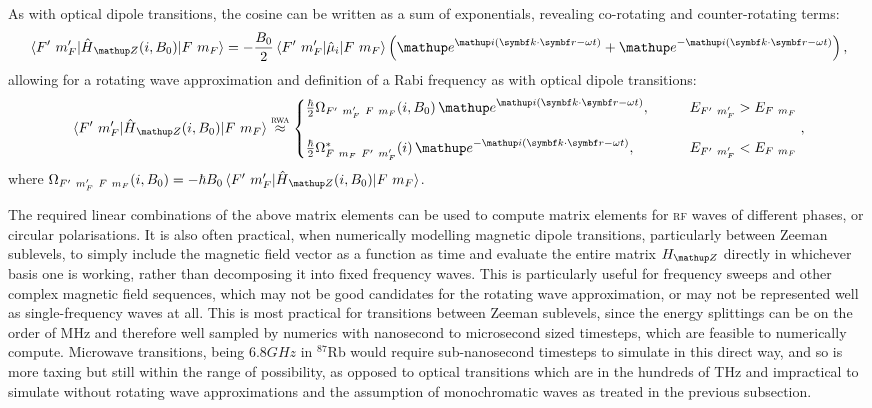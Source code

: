 As with optical dipole transitions, the cosine can be written as a sum of exponentials, revealing co-rotating and counter-rotating terms:
\begin{align}
\matrixel{F^\prime\ m_F^\prime}{\hat H_\up{Z}(i, B_0)}{F\ m_F}
=
-\frac{B_0}2\matrixel{F^\prime\ m_F^\prime}{\hat{\mu}_i}{F\ m_F}
\left(\ee^{\ii(\vec k\cdot \vec r - \omega t)}
+ \ee^{-\ii(\vec k\cdot \vec r - \omega t)}\right),
\end{align}
allowing for a rotating wave approximation and definition of a Rabi frequency as with optical dipole transitions:
\begin{align}\label{eq:magnetic_rwa_with_rabifreq}
\matrixel{F^\prime\ m_F^\prime}{\hat H_\up{Z}(i, B_0)}{F\ m_F} \overset{\textsc{rwa}}\approx
\begin{cases}
\frac\hbar2\Omega_{F^\prime\ m_F^\prime\ F\ m_F}(i, B_0)\,
\ee^{\ii(\vec k \cdot \vec r - \omega t)},\qquad
& E_{F^\prime\ m_F^\prime} > E_{F\ m_F}\\
\\
\frac\hbar2\Omega^*_{F\ m_F\ F^\prime\ m_F^\prime}(i)\,
\ee^{-\ii(\vec k \cdot \vec r - \omega t)},\qquad
& E_{F^\prime\ m_F^\prime} < E_{F\ m_F}
\end{cases},
\end{align}
where $\Omega_{F^\prime\ m_F^\prime\ F\ m_F}(i, B_0) = -\hbar B_0 \matrixel{F^\prime\ m_F^\prime}{\hat H_\up{Z}(i, B_0)}{F\ m_F}$.

The required linear combinations of the above matrix elements can be used to compute matrix elements for \textsc{rf} waves of different phases, or circular polarisations. It is also often practical, when numerically modelling magnetic dipole transitions, particularly between Zeeman sublevels, to simply include the magnetic field vector as a function as time and evaluate the entire matrix $H_\up{Z}$ directly in whichever basis one is working, rather than decomposing it into fixed frequency waves. This is particularly useful for frequency sweeps and other complex magnetic field sequences, which may not be good candidates for the rotating wave approximation, or may not be represented well as single-frequency waves at all. This is most practical for transitions between Zeeman sublevels, since the energy splittings can be on the order of MHz and therefore well sampled by numerics with nanosecond to microsecond sized timesteps, which are feasible to numerically compute. Microwave transitions, being $6.8 \unit{GHz}$ in $^{87}$Rb would require sub-nanosecond timesteps to simulate in this direct way, and so is more taxing but still within the range of possibility, as opposed to optical transitions which are in the hundreds of THz and impractical to simulate without rotating wave approximations and the assumption of monochromatic waves as treated in the previous subsection.


